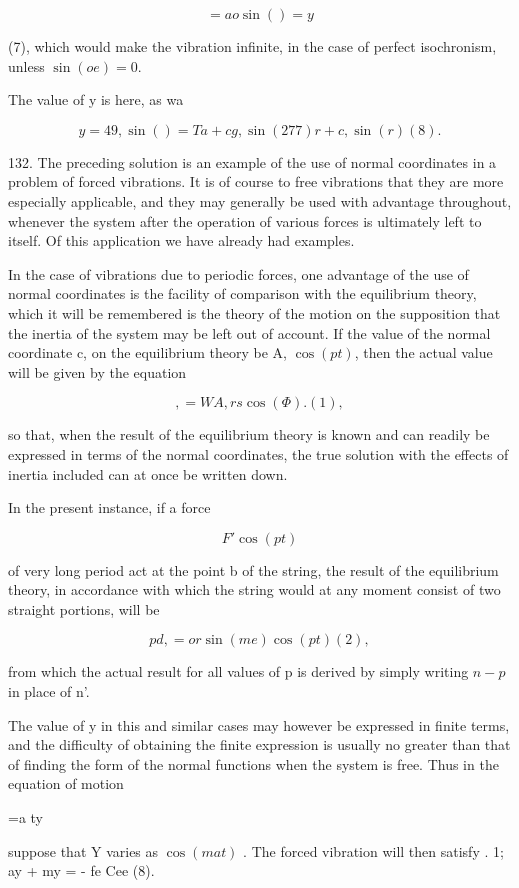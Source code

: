 \[= ao \sin()= y\]

(7), which would make the vibration infinite, in the case of perfect
isochronism, unless \(\sin(oe) =0\).

The value of y is here, as wa

\[y=49, \sin()= T a+ cg, \sin(277) r+ c, \sin(r) (8).\]

132. The preceding solution is an example of the use of normal coordinates in a
problem of forced vibrations. It is of course to free vibrations that they are
more especially applicable, and they may generally be used with advantage
throughout, whenever the system after the operation of various forces is
ultimately left to itself. Of this application we have already had examples.

In the case of vibrations due to periodic forces, one advantage of the use of
normal coordinates is the facility of comparison with the equilibrium theory,
which it will be remembered is the theory of the motion on the supposition that
the inertia of the system may be left out of account. If the value of the
normal coordinate c, on the equilibrium theory be A, \(\cos(pt)\), then the
actual value will be given by the equation

\[,= WA, rs \cos( \Phi ). (1),\]

so that, when the result of the equilibrium theory is known and can readily be
expressed in terms of the normal coordinates, the true solution with the
effects of inertia included can at once be written down.

In the present instance, if a force

\[F' \cos(pt)\]

of very long period act at the point b of the string, the result of the
equilibrium theory, in accordance with which the string would at any moment
consist of two straight portions, will be

\[pd, = or \sin(me) \cos(pt) (2),\]


from which the actual result for all values of p is derived by simply writing
\(n - p\) in place of n'.

The value of y in this and similar cases may however be expressed in finite
terms, and the difficulty of obtaining the finite expression is usually no
greater than that of finding the form of the normal functions when the system
is free. Thus in the equation of motion

=a ty

suppose that Y varies as \(\cos(mat)\) . The forced vibration will then satisfy
. 1; ay + my = - fe Cee (8).

